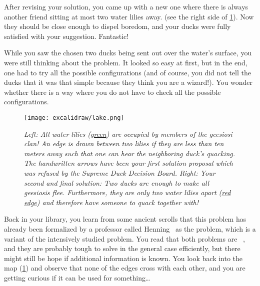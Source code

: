 After revising your solution, you came up with a new one where there is always another friend sitting at most two water lilies away. (see the right side of \cref{fig:duck-lake}). 
Now they should be close enough to dispel boredom, and your ducks were fully satisfied with your suggestion. 
Fantastic!

While you saw the chosen two ducks being sent out over the water's surface, you were still thinking about the problem.
It looked so easy at first, but in the end, one had to try all the possible configurations (and of course, you did not tell the ducks that it was that simple because they think you are a wizard!).
You wonder whether there is a way where you do not have to check all the possible configurations.

\begin{figure}[t]
    \centering
    \texttt{[image: excalidraw/lake.png]}
    \caption[Introductions: Merganser Lake. Own Drawing. Embedded icons under public domain from {\href{https://creazilla.com/}{https://creazilla.com/}}]{\textit{Left: All water lilies ({\ul{green}}) are occupied by members of the \textit{geesiosi} clan!
    An edge is drawn between two lilies if they are less than ten meters away such that one can hear the neighboring duck's quacking. 
    The handwritten arrows have been your first solution proposal which was refused by the \textit{Supreme Duck Decision Board}.
    Right: Your second and final solution: Two ducks are enough to make all \textit{geesiosi}s flee. Furthermore, they are only two water lilies apart ({\ul{red edge}}) and therefore have someone to quack together with!}}
    \label{fig:duck-lake}
\end{figure}

Back in your library, you learn from some ancient scrolls that this problem has already been formalized by a professor called Henning~\cite{Henning2019} as the \sdom problem, which is a variant of the intensively studied \dom problem. 
You read that both problems are \NPc~\cite{Garey1979,Henning2019}, and they are probably tough to solve in the general case efficiently, but there might still be hope if additional information is known. 
You look back into the map (\cref{fig:duck-lake}) and observe that none of the edges cross with each other, and you are getting curious if it can be used for something\ldots

